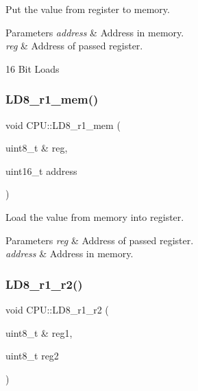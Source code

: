 Put the value from register to memory. 


\begin{DoxyParams}{Parameters}
{\em address} & Address in memory. \\
\hline
{\em reg} & Address of passed register.\\
\hline
\end{DoxyParams}
16 Bit Loads \mbox{\label{classCPU_a05339d6c6a297627b57ded8a5e098506}} 
\subsubsection{\texorpdfstring{L\+D8\+\_\+r1\+\_\+mem()}{LD8\_r1\_mem()}}
{\footnotesize\ttfamily void C\+P\+U\+::\+L\+D8\+\_\+r1\+\_\+mem (\begin{DoxyParamCaption}\item[{uint8\+\_\+t \&}]{reg,  }\item[{uint16\+\_\+t}]{address }\end{DoxyParamCaption})\hspace{0.3cm}{\ttfamily [private]}}



Load the value from memory into register. 


\begin{DoxyParams}{Parameters}
{\em reg} & Address of passed register. \\
\hline
{\em address} & Address in memory. \\
\hline
\end{DoxyParams}
\mbox{\label{classCPU_a286b8ef2d55ac76be40389da5cd84ce4}} 
\subsubsection{\texorpdfstring{L\+D8\+\_\+r1\+\_\+r2()}{LD8\_r1\_r2()}}
{\footnotesize\ttfamily void C\+P\+U\+::\+L\+D8\+\_\+r1\+\_\+r2 (\begin{DoxyParamCaption}\item[{uint8\+\_\+t \&}]{reg1,  }\item[{uint8\+\_\+t}]{reg2 }\end{DoxyParamCaption})\hspace{0.3cm}{\ttfamily [private]}}



